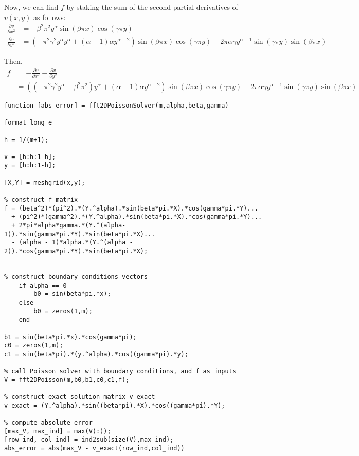 \documentclass[12pt]{article}
\begin{document}
\begin{itemize}
Now, we can find $f$ by staking the sum of the second partial derivatives of $v(x,y)$ as follows:
\begin{align}
\frac{\partial v}{\partial x^2} &= -\beta^2\pi^2y^\alpha\sin(\beta\pi x)\cos(\gamma\pi y) \nonumber \\
\frac{\partial v}{\partial y^2} &= (-\pi^2\gamma^2y^\alpha y^\alpha + (\alpha - 1)\alpha y^{\alpha - 2})\sin(\beta\pi x)\cos(\gamma\pi y) - 2\pi\alpha\gamma y^{\alpha - 1}\sin(\gamma\pi y)\sin(\beta\pi x) \nonumber
\end{align}

Then,
\begin{align}
f &= -\frac{\partial v}{\partial x^2} - \frac{\partial v}{\partial y^2} \nonumber \\
&= ((-\pi^2\gamma^2y^\alpha - \beta^2\pi^2 )y^\alpha + (\alpha - 1)\alpha y^{\alpha - 2})\sin(\beta\pi x)\cos(\gamma\pi y) - 2\pi\alpha\gamma y^{\alpha - 1}\sin(\gamma\pi y)\sin(\beta\pi x) \nonumber
\end{align}


\lstset{language=matlab,frame=single}
\begin{lstlisting}[caption= Function To Approximate \text{$V(x,y)$} with Given BCs]
function [abs_error] = fft2DPoissonSolver(m,alpha,beta,gamma)

format long e

h = 1/(m+1);

x = [h:h:1-h];
y = [h:h:1-h];

[X,Y] = meshgrid(x,y);

% construct f matrix
f = (beta^2)*(pi^2).*(Y.^alpha).*sin(beta*pi.*X).*cos(gamma*pi.*Y)...
  + (pi^2)*(gamma^2).*(Y.^alpha).*sin(beta*pi.*X).*cos(gamma*pi.*Y)...
  + 2*pi*alpha*gamma.*(Y.^(alpha-1)).*sin(gamma*pi.*Y).*sin(beta*pi.*X)...
  - (alpha - 1)*alpha.*(Y.^(alpha - 2)).*cos(gamma*pi.*Y).*sin(beta*pi.*X);
        

% construct boundary conditions vectors
    if alpha == 0
        b0 = sin(beta*pi.*x);
    else
        b0 = zeros(1,m);
    end

b1 = sin(beta*pi.*x).*cos(gamma*pi);
c0 = zeros(1,m);
c1 = sin(beta*pi).*(y.^alpha).*cos((gamma*pi).*y);

% call Poisson solver with boundary conditions, and f as inputs
V = fft2DPoisson(m,b0,b1,c0,c1,f);

% construct exact solution matrix v_exact
v_exact = (Y.^alpha).*sin((beta*pi).*X).*cos((gamma*pi).*Y);

% compute absolute error
[max_V, max_ind] = max(V(:));
[row_ind, col_ind] = ind2sub(size(V),max_ind);
abs_error = abs(max_V - v_exact(row_ind,col_ind))



\end{lstlisting}
\end{itemize}
\end{document}
